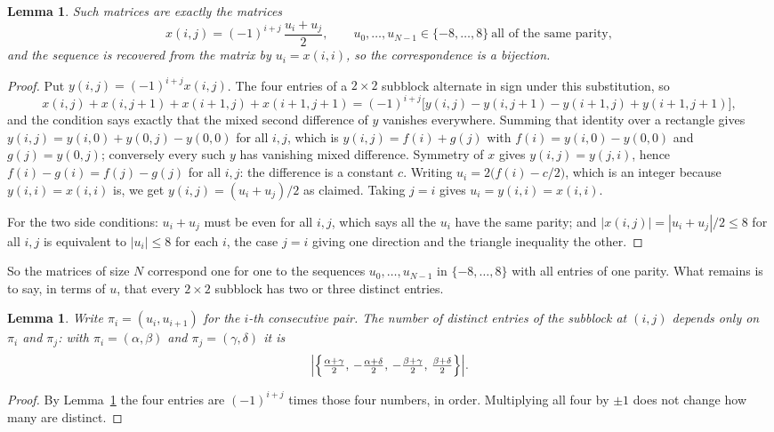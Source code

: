 \documentclass[11pt,a4paper]{article}
\theoremstyle{plain}
\newtheorem{lemma}[theorem]{Lemma}
\theoremstyle{definition}
\begin{document}
\begin{lemma}\label{lem:solve}
Such matrices are exactly the matrices
\[
x(i,j)=(-1)^{i+j}\,\frac{u_i+u_j}{2},
\qquad u_0,\dots,u_{N-1}\in\{-8,\dots,8\}\ \text{all of the same parity},
\]
and the sequence is recovered from the matrix by $u_i=x(i,i)$, so the correspondence is a
bijection.
\end{lemma}

\begin{proof}
Put $y(i,j)=(-1)^{i+j}x(i,j)$. The four entries of a $2\times2$ subblock alternate in sign
under this substitution, so
\[
x(i,j)+x(i,j{+}1)+x(i{+}1,j)+x(i{+}1,j{+}1)
=(-1)^{i+j}\bigl[y(i,j)-y(i,j{+}1)-y(i{+}1,j)+y(i{+}1,j{+}1)\bigr],
\]
and the condition says exactly that the mixed second difference of $y$ vanishes everywhere.
Summing that identity over a rectangle gives
$y(i,j)=y(i,0)+y(0,j)-y(0,0)$ for all $i,j$, which is $y(i,j)=f(i)+g(j)$ with
$f(i)=y(i,0)-y(0,0)$ and $g(j)=y(0,j)$; conversely every such $y$ has vanishing mixed
difference. Symmetry of $x$ gives $y(i,j)=y(j,i)$, hence $f(i)-g(i)=f(j)-g(j)$ for all $i,j$:
the difference is a constant $c$. Writing $u_i=2\bigl(f(i)-c/2\bigr)$, which is an integer
because $y(i,i)=x(i,i)$ is, we get $y(i,j)=(u_i+u_j)/2$ as claimed. Taking $j=i$ gives
$u_i=y(i,i)=x(i,i)$.

For the two side conditions: $u_i+u_j$ must be even for all $i,j$, which says all the $u_i$ have
the same parity; and $|x(i,j)|=|u_i+u_j|/2\le8$ for all $i,j$ is equivalent to $|u_i|\le8$
for each $i$, the case $j=i$ giving one direction and the triangle inequality the other.
\end{proof}

So the matrices of size $N$ correspond one for one to the sequences $u_0,\dots,u_{N-1}$ in
$\{-8,\dots,8\}$ with all entries of one parity. What remains is to say, in terms of $u$,
that every $2\times2$ subblock has two or three distinct entries.

\begin{lemma}\label{lem:block}
Write $\pi_i=(u_i,u_{i+1})$ for the $i$-th consecutive pair. The number of distinct entries of
the subblock at $(i,j)$ depends only on $\pi_i$ and $\pi_j$: with $\pi_i=(\alpha,\beta)$ and
$\pi_j=(\gamma,\delta)$ it is
\[
\Bigl|\Bigl\{\tfrac{\alpha+\gamma}{2},\,-\tfrac{\alpha+\delta}{2},\,
-\tfrac{\beta+\gamma}{2},\,\tfrac{\beta+\delta}{2}\Bigr\}\Bigr| .
\]
\end{lemma}

\begin{proof}
By Lemma~\ref{lem:solve} the four entries are $(-1)^{i+j}$ times those four numbers, in
order. Multiplying all four by $\pm1$ does not change how many are distinct.
\end{proof}
\end{document}
